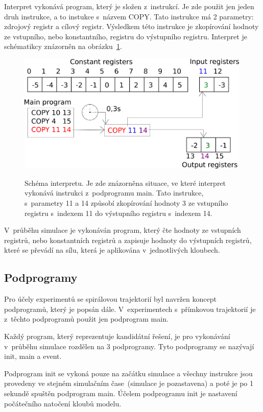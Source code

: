 Interpret vykonává program, který je složen z~instrukcí.
Je zde použit jen jeden druh instrukce, a to instukce s~názvem COPY\@.
Tato instrukce má 2 parametry: zdrojový registr a cílový registr.
Výsledkem této instrukce je zkopírování hodnoty ze vstupního, nebo konstantního, registru do výstupního registru.
Interpret je schématikcy znázorněn na obrázku~\ref{fig:interpret}.

\begin{figure}[h]
    \centering
    {\includegraphics[width=30em]{obrazky/interpret.png}}
    \caption[Schéma interpretu]{
    Schéma interpretu.
    Je zde znázorněna situace, ve které interpret vykonává instrukci z~podprogramu main.
    Tato instrukce, s~parametry 11 a 14 způsobí zkopírování hodnoty 3 ze vstupního registru s~indexem 11 do výstupního registru s~indexem 14.
    }
    \label{fig:interpret}
\end{figure}

V~průběhu simulace je vykonáván program, který čte hodnoty ze vstupních registrů, nebo konstantních registrů a zapisuje hodnoty do výstupních registrů, které se převádí na sílu, která je aplikována v~jednotlivých kloubech.

\subsection{Podprogramy}

Pro účely experimentů se spirálovou trajektorií byl navržen koncept podprogramů, který je popsán dále.
V~experimentech s~přímkovou trajektorií je z~těchto podprogramů použit jen podprogram main.

Každý program, který reprezentuje kandidátní řešení, je pro vykonávání v~průběhu simulace rozdělen na 3 podprogramy.
Tyto podprogramy se nazývají init, main a event.

Podprogram init se vykoná pouze na začátku simulace a všechny instrukce jsou provedeny ve stejném simulačním čase~(simulace je pozastavena) a poté je po 1 sekundě spuštěn podprogram main.
Účelem podprogramu init je nastavení počátečního natočení kloubů modelu.

